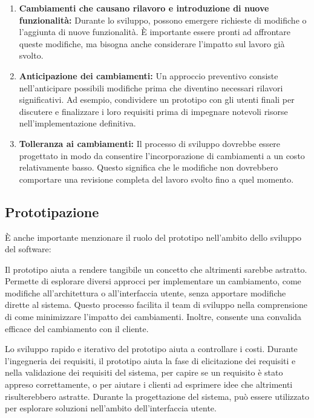 \begin{enumerate}
    \item \textbf{Cambiamenti che causano rilavoro e introduzione di nuove funzionalità:}
    Durante lo sviluppo, possono emergere richieste di modifiche o l'aggiunta di nuove
    funzionalità. È importante essere pronti ad affrontare queste modifiche,
    ma bisogna anche considerare l'impatto sul lavoro già svolto.
    
    \item \textbf{Anticipazione dei cambiamenti:} Un approccio preventivo consiste
    nell'anticipare possibili modifiche prima che diventino necessari
    rilavori significativi. Ad esempio, condividere un prototipo con gli utenti finali
    per discutere e finalizzare i loro requisiti prima di impegnare notevoli risorse
    nell'implementazione definitiva.
    
    \item \textbf{Tolleranza ai cambiamenti:} Il processo di sviluppo dovrebbe essere
    progettato in modo da consentire l'incorporazione di cambiamenti a un costo
    relativamente basso. Questo significa che le modifiche non dovrebbero comportare
    una revisione completa del lavoro svolto fino a quel momento.
\end{enumerate}
\subsection{Prototipazione}
È anche importante menzionare il ruolo del prototipo nell'ambito dello
sviluppo del software:
\begin{tcolorbox}[title = Prototipo]
    Il prototipo aiuta a rendere tangibile un concetto che altrimenti
    sarebbe astratto. Permette di esplorare diversi approcci per implementare
    un cambiamento, come modifiche all'architettura o all'interfaccia utente,
    senza apportare modifiche dirette al sistema. Questo processo facilita il
    team di sviluppo nella comprensione di come minimizzare l'impatto dei
    cambiamenti. Inoltre, consente una convalida efficace
    del cambiamento con il cliente.
\end{tcolorbox}
Lo sviluppo rapido e iterativo del prototipo aiuta a controllare i costi.
Durante l'ingegneria dei requisiti, il prototipo aiuta la fase di elicitazione
dei requisiti e
nella validazione dei requisiti del sistema, per capire se un requisito è stato appreso
correttamente, o per aiutare i clienti ad esprimere idee che altrimenti risulterebbero 
astratte. Durante la progettazione del
sistema, può essere utilizzato per esplorare soluzioni nell'ambito dell'interfaccia
utente.
